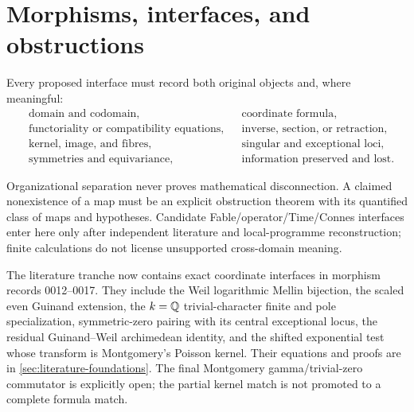 \section{Morphisms, interfaces, and obstructions}

Every proposed interface must record both original objects and, where meaningful:
\begin{align*}
  &\text{domain and codomain}, &&\text{coordinate formula},\\
  &\text{functoriality or compatibility equations}, &&\text{inverse, section, or retraction},\\
  &\text{kernel, image, and fibres}, &&\text{singular and exceptional loci},\\
  &\text{symmetries and equivariance}, &&\text{information preserved and lost}.
\end{align*}

Organizational separation never proves mathematical disconnection.  A claimed nonexistence of
a map must be an explicit obstruction theorem with its quantified class of maps and hypotheses.
Candidate Fable/operator/Time/Connes interfaces enter here only after independent literature and
local-programme reconstruction; finite calculations do not license unsupported cross-domain
meaning.

The literature tranche now contains exact coordinate interfaces in morphism records
0012--0017.  They include the Weil logarithmic
Mellin bijection, the scaled even Guinand extension, the $k=\mathbb{Q}$ trivial-character finite and
pole specialization, symmetric-zero pairing with its central exceptional locus, the residual
Guinand--Weil archimedean identity, and the shifted exponential test whose transform is
Montgomery's Poisson kernel.  Their equations and proofs are in
\cref{sec:literature-foundations}.  The final Montgomery gamma/trivial-zero commutator is
explicitly open; the partial kernel match is not promoted to a complete formula match.
